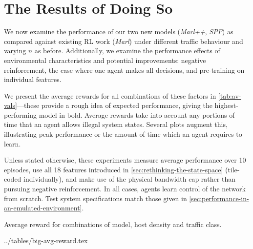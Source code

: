 \documentclass[conference, letterpaper, 10pt, times]{IEEEtran}
\begin{document}
\section{The Results of Doing So}
\label{sec:the-results-of-doing-so}

We now examine the performance of our two new models (\emph{Marl++}, \emph{SPF}) as compared against existing RL work (\emph{Marl}) under different traffic behaviour and varying $n$ as before.
Additionally, we examine the performance effects of environmental characteristics and potential improvements: negative reinforcement, the case where one agent makes all decisions, and pre-training on individual features.

We present the average rewards for all combinations of these factors in \cref{tab:av-vals}---these provide a rough idea of expected performance, giving the highest-performing model in bold.
Average rewards take into account any portions of time that an agent allows illegal system states.
Several plots augment this, illustrating peak performance or the amount of time which an agent requires to learn.

Unless stated otherwise, these experiments measure average performance over 10 episodes, use all \num{18} features introduced in \cref{sec:rethinking-the-state-space} (tile-coded individually), and make use of the physical bandwidth cap rather than pursuing negative reinforcement.
In all cases, agents learn control of the network from scratch.
Test system specifications match those given in \cref{sec:performance-in-an-emulated-environment}.

\begin{table}
	\centering
	\caption{Average reward for combinations of model, host density and traffic class.\label{tab:av-vals}}
	
	\expandableinput ../tables/big-avg-reward.tex
\end{table}
\end{document}
